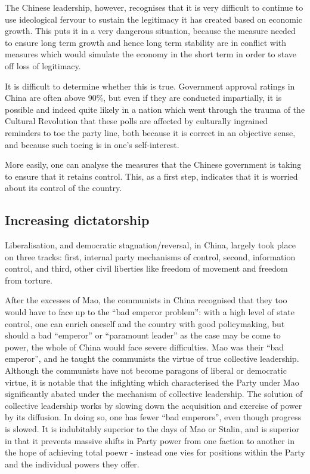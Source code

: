 \documentclass[10pt,a4paper,twocolumn]{article}
\newcounter{count}
\begin{document}
The Chinese leadership, however, recognises that it is very difficult to continue to use ideological fervour to sustain the legitimacy it has created based on economic growth. This puts it in a very dangerous situation, because the measure needed to ensure long term growth and hence long term stability are in conflict with measures which would simulate the economy in the short term in order to stave off loss of legitimacy.

It is difficult to determine whether this is true. Government approval ratings in China are often above 90\%, but even if they are conducted impartially, it is possible and indeed quite likely in a nation which went through the trauma of the Cultural Revolution that these polls are affected by culturally ingrained reminders to toe the party line, both because it is correct in an objective sense, and because such toeing is in one's self-interest.

More easily, one can analyse the measures that the Chinese government is taking to ensure that it retains control. This, as a first step, indicates that it is worried about its control of the country.

\subsection{Increasing dictatorship}

Liberalisation, and democratic stagnation/reversal, in China, largely took place on three tracks: first, internal party mechanisms of control, second, information control, and third, other civil liberties like freedom of movement and freedom from torture.

After the excesses of Mao, the communists in China recognised that they too would have to face up to the ``bad emperor problem'': with a high level of state control, one can enrich oneself and the country with good policymaking, but should a bad ``emperor'' or ``paramount leader'' as the case may be come to power, the whole of China would face severe difficulties. Mao was their ``bad emperor'', and he taught the communists the virtue of true collective leadership. Although the communists have not become paragons of liberal or democratic virtue, it is notable that the infighting which characterised the Party under Mao significantly abated under the mechanism of collective leadership. The solution of collective leadership works by slowing down the acquisition and exercise of power by its diffusion. In doing so, one has fewer ``bad emperors'', even though progress is slowed. It is indubitably superior to the days of Mao or Stalin, and is superior in that it prevents massive shifts in Party power from one faction to another in the hope of achieving total poewr - instead one vies for positions within the Party and the individual powers they offer.
\end{document}
